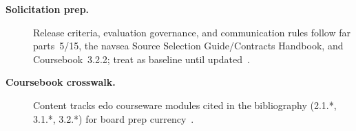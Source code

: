 \documentclass[../main.tex]{subfiles}
\begin{document}
\begin{description}
  \item[\textbf{Solicitation prep.}] Release criteria, evaluation governance, and communication rules follow \ac{far} parts~5/15, the \ac{navsea} Source Selection Guide/Contracts Handbook, and Coursebook~3.2.2; treat as baseline until updated~\autocite{FAR,NAVSEA-Source-Selection-Guide-2022,NAVSEA-Contracts-Handbook-2023,edo-3-2-2-solicitation-prep-2025}.
  \item[\textbf{Coursebook crosswalk.}] Content tracks \ac{edo} courseware modules cited in the bibliography (2.1.*, 3.1.*, 3.2.*) for board prep currency~\autocite{edo-2-1-1-command-structures-2025,edo-2-1-5-technical-authority-2025,edo-3-1-1-ppbe-2025,edo-3-1-4-budget-execution-2025,edo-3-2-1-intro-contracting-2025,edo-3-2-2-solicitation-prep-2025}.
\end{description}
\HR

\end{document}
